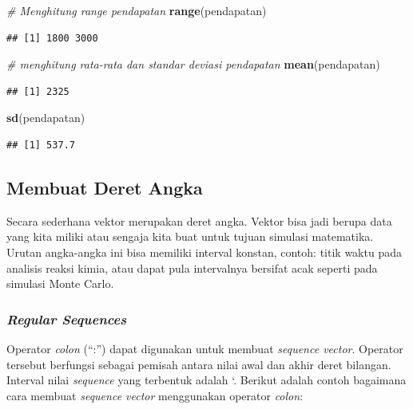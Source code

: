 \documentclass[
]{book}
\newenvironment{Shaded}{\begin{snugshade}}{\end{snugshade}}
\newcommand{\CommentTok}[1]{\textcolor[rgb]{0.56,0.35,0.01}{\textit{#1}}}
\newcommand{\FunctionTok}[1]{\textcolor[rgb]{0.13,0.29,0.53}{\textbf{#1}}}
\newcommand{\NormalTok}[1]{#1}
\theoremstyle{definition}
\theoremstyle{definition}
\theoremstyle{definition}
\theoremstyle{definition}
\theoremstyle{remark}
\begin{document}
\begin{Shaded}
\begin{Highlighting}[]
\CommentTok{\# Menghitung range pendapatan}
\FunctionTok{range}\NormalTok{(pendapatan)}
\end{Highlighting}
\end{Shaded}

\begin{verbatim}
## [1] 1800 3000
\end{verbatim}

\begin{Shaded}
\begin{Highlighting}[]
\CommentTok{\# menghitung rata{-}rata dan standar deviasi pendapatan}
\FunctionTok{mean}\NormalTok{(pendapatan)}
\end{Highlighting}
\end{Shaded}

\begin{verbatim}
## [1] 2325
\end{verbatim}

\begin{Shaded}
\begin{Highlighting}[]
\FunctionTok{sd}\NormalTok{(pendapatan)}
\end{Highlighting}
\end{Shaded}

\begin{verbatim}
## [1] 537.7
\end{verbatim}

\hypertarget{seq}{%
\subsection{Membuat Deret Angka}\label{seq}}

Secara sederhana vektor merupakan deret angka. Vektor bisa jadi berupa data yang kita miliki atau sengaja kita buat untuk tujuan simulasi matematika. Urutan angka-angka ini bisa memiliki interval konstan, contoh: titik waktu pada analisis reaksi kimia, atau dapat pula intervalnya bersifat acak seperti pada simulasi Monte Carlo.

\hypertarget{regseq}{%
\subsubsection{\texorpdfstring{\emph{Regular Sequences}}{Regular Sequences}}\label{regseq}}

Operator \emph{colon} (``:'') dapat digunakan untuk membuat \emph{sequence vector}. Operator tersebut berfungsi sebagai pemisah antara nilai awal dan akhir deret bilangan. Interval nilai \emph{sequence} yang terbentuk adalah `. Berikut adalah contoh bagaimana cara membuat \emph{sequence vector} menggunakan operator \emph{colon}:
\end{document}
